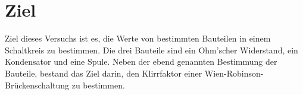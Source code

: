 \section{Ziel}
\label{sec:Ziel}
Ziel dieses Versuchs ist es, die Werte von bestimmten Bauteilen in einem Schaltkreis zu bestimmen. Die drei Bauteile sind ein Ohm'scher Widerstand, ein Kondensator
und eine Spule. Neben der ebend genannten Bestimmung der Bauteile, bestand das Ziel darin, den Klirrfaktor einer Wien-Robinson-Brückenschaltung zu bestimmen.
